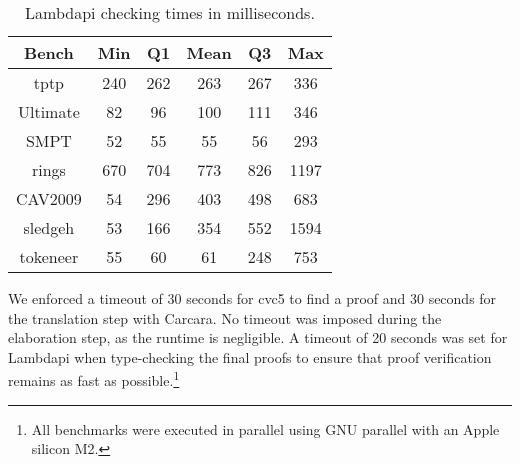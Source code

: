 \begin{table}[tb]
\centering
\caption{Lambdapi checking times in milliseconds.}
\begin{tabular}{|c|c|c|c|c|c|}
\hline
\textbf{Bench}      & \textbf{Min} & \textbf{Q1} & \textbf{Mean} & \textbf{Q3} & \textbf{Max} \\ \hline
tptp                & 240          & 262         & 263           & 267         & 336          \\ \hline
Ultimate            & 82           & 96          & 100           & 111         & 346          \\ \hline
SMPT                & 52           & 55          & 55            & 56          & 293          \\ \hline
rings               & 670          & 704         & 773           & 826         & 1197         \\ \hline
CAV2009           & 54           & 296         & 403           & 498         & 683          \\ \hline
sledgeh             & 53           & 166         & 354           & 552         & 1594         \\ \hline
tokeneer            & 55           & 60          & 61            & 248         & 753          \\ \hline
\end{tabular}
\label{table:benchmarks-list}
\end{table}

We enforced a timeout of 30 seconds for cvc5 to find a proof and 30 seconds for the translation step with Carcara.
No timeout was imposed during the elaboration step, as the runtime is negligible.
A timeout of 20 seconds was set for Lambdapi when type-checking the final proofs to ensure that proof verification remains as fast as possible.\footnote{All benchmarks were executed in parallel using GNU parallel \cite{tange_2025_15071920} with an Apple silicon M2.} %

